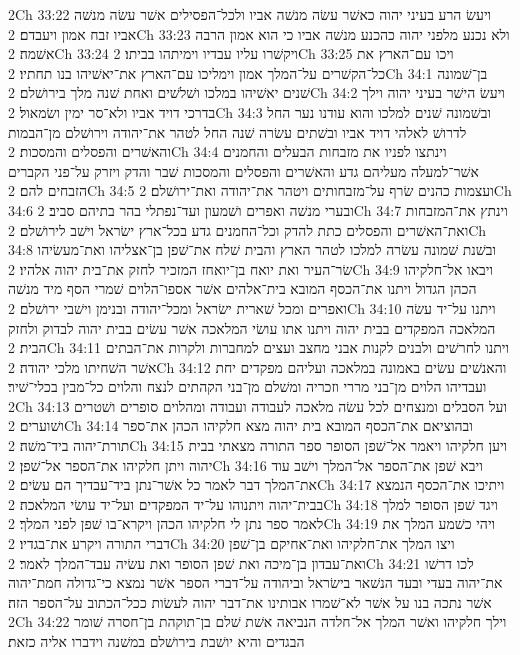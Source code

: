 2Ch 33:22  ויעשׂ הרע בעיני יהוה כאשׁר עשׂה מנשׁה אביו ולכל־הפסילים אשׁר עשׂה מנשׁה אביו זבח אמון ויעבדם׃
2Ch 33:23  ולא נכנע מלפני יהוה כהכנע מנשׁה אביו כי הוא אמון הרבה אשׁמה׃
2Ch 33:24  ויקשׁרו עליו עבדיו וימיתהו בביתו׃
2Ch 33:25  ויכו עם־הארץ את כל־הקשׁרים על־המלך אמון וימליכו עם־הארץ את־יאשׁיהו בנו תחתיו׃
2Ch 34:1  בן־שׁמונה שׁנים יאשׁיהו במלכו ושׁלשׁים ואחת שׁנה מלך בירושׁלם׃
2Ch 34:2  ויעשׂ הישׁר בעיני יהוה וילך בדרכי דויד אביו ולא־סר ימין ושׂמאול׃
2Ch 34:3  ובשׁמונה שׁנים למלכו והוא עודנו נער החל לדרושׁ לאלהי דויד אביו ובשׁתים עשׂרה שׁנה החל לטהר את־יהודה וירושׁלם מן־הבמות והאשׁרים והפסלים והמסכות׃
2Ch 34:4  וינתצו לפניו את מזבחות הבעלים והחמנים אשׁר־למעלה מעליהם גדע והאשׁרים והפסלים והמסכות שׁבר והדק ויזרק על־פני הקברים הזבחים להם׃
2Ch 34:5  ועצמות כהנים שׂרף על־מזבחותים ויטהר את־יהודה ואת־ירושׁלם׃
2Ch 34:6  ובערי מנשׁה ואפרים ושׁמעון ועד־נפתלי בהר בתיהם סביב׃
2Ch 34:7  וינתץ את־המזבחות ואת־האשׁרים והפסלים כתת להדק וכל־החמנים גדע בכל־ארץ ישׂראל וישׁב לירושׁלם׃
2Ch 34:8  ובשׁנת שׁמונה עשׂרה למלכו לטהר הארץ והבית שׁלח את־שׁפן בן־אצליהו ואת־מעשׂיהו שׂר־העיר ואת יואח בן־יואחז המזכיר לחזק את־בית יהוה אלהיו׃
2Ch 34:9  ויבאו אל־חלקיהו הכהן הגדול ויתנו את־הכסף המובא בית־אלהים אשׁר אספו־הלוים שׁמרי הסף מיד מנשׁה ואפרים ומכל שׁארית ישׂראל ומכל־יהודה ובנימן וישׁבי ירושׁלם׃
2Ch 34:10  ויתנו על־יד עשׂה המלאכה המפקדים בבית יהוה ויתנו אתו עושׂי המלאכה אשׁר עשׂים בבית יהוה לבדוק ולחזק הבית׃
2Ch 34:11  ויתנו לחרשׁים ולבנים לקנות אבני מחצב ועצים למחברות ולקרות את־הבתים אשׁר השׁחיתו מלכי יהודה׃
2Ch 34:12  והאנשׁים עשׂים באמונה במלאכה ועליהם מפקדים יחת ועבדיהו הלוים מן־בני מררי וזכריה ומשׁלם מן־בני הקהתים לנצח והלוים כל־מבין בכלי־שׁיר׃
2Ch 34:13  ועל הסבלים ומנצחים לכל עשׂה מלאכה לעבודה ועבודה ומהלוים סופרים ושׁטרים ושׁוערים׃
2Ch 34:14  ובהוציאם את־הכסף המובא בית יהוה מצא חלקיהו הכהן את־ספר תורת־יהוה ביד־משׁה׃
2Ch 34:15  ויען חלקיהו ויאמר אל־שׁפן הסופר ספר התורה מצאתי בבית יהוה ויתן חלקיהו את־הספר אל־שׁפן׃
2Ch 34:16  ויבא שׁפן את־הספר אל־המלך וישׁב עוד את־המלך דבר לאמר כל אשׁר־נתן ביד־עבדיך הם עשׂים׃
2Ch 34:17  ויתיכו את־הכסף הנמצא בבית־יהוה ויתנוהו על־יד המפקדים ועל־יד עושׂי המלאכה׃
2Ch 34:18  ויגד שׁפן הסופר למלך לאמר ספר נתן לי חלקיהו הכהן ויקרא־בו שׁפן לפני המלך׃
2Ch 34:19  ויהי כשׁמע המלך את דברי התורה ויקרע את־בגדיו׃
2Ch 34:20  ויצו המלך את־חלקיהו ואת־אחיקם בן־שׁפן ואת־עבדון בן־מיכה ואת שׁפן הסופר ואת עשׂיה עבד־המלך לאמר׃
2Ch 34:21  לכו דרשׁו את־יהוה בעדי ובעד הנשׁאר בישׂראל וביהודה על־דברי הספר אשׁר נמצא כי־גדולה חמת־יהוה אשׁר נתכה בנו על אשׁר לא־שׁמרו אבותינו את־דבר יהוה לעשׂות ככל־הכתוב על־הספר הזה׃
2Ch 34:22  וילך חלקיהו ואשׁר המלך אל־חלדה הנביאה אשׁת שׁלם בן־תוקהת בן־חסרה שׁומר הבגדים והיא יושׁבת בירושׁלם במשׁנה וידברו אליה כזאת׃
